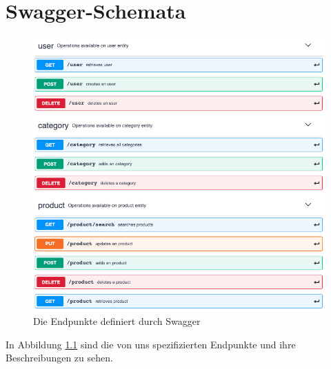 \documentclass[
               letterpaper,%
               10pt,%
               oneside,%
               onecolumn,%
               final,%
               openany%
              ]{report}
\begin{document}
\chapter{Swagger-Schemata}
\begin{figure}[h!]
\includegraphics[scale=0.4]{schema1}
\caption{Die Endpunkte definiert durch Swagger}
\label{fig:schema1}
\centering
\end{figure}
In Abbildung \ref{fig:schema1} sind die von uns spezifizierten Endpunkte und ihre Beschreibungen zu sehen. 
\end{document}
